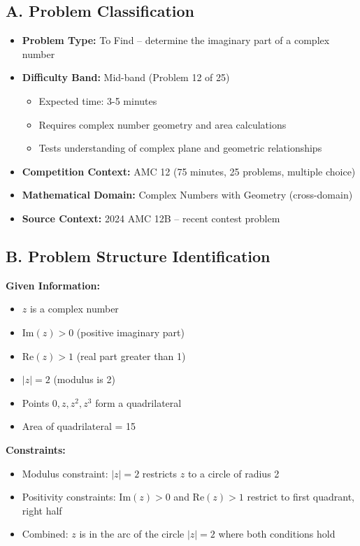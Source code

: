 \documentclass[12pt]{article}
\begin{document}
\begin{problemconfigbox}
\subsection*{A. Problem Classification}

\begin{itemize}[leftmargin=*]
    \item \textbf{Problem Type:} To Find -- determine the imaginary part of a complex number
    \item \textbf{Difficulty Band:} Mid-band (Problem 12 of 25)
    \begin{itemize}
        \item Expected time: 3-5 minutes
        \item Requires complex number geometry and area calculations
        \item Tests understanding of complex plane and geometric relationships
    \end{itemize}
    \item \textbf{Competition Context:} AMC 12 (75 minutes, 25 problems, multiple choice)
    \item \textbf{Mathematical Domain:} Complex Numbers with Geometry (cross-domain)
    \item \textbf{Source Context:} 2024 AMC 12B -- recent contest problem
\end{itemize}

\subsection*{B. Problem Structure Identification}

\textbf{Given Information:}
\begin{itemize}
    \item $z$ is a complex number
    \item $\text{Im}(z) > 0$ (positive imaginary part)
    \item $\text{Re}(z) > 1$ (real part greater than 1)
    \item $|z| = 2$ (modulus is 2)
    \item Points $0, z, z^2, z^3$ form a quadrilateral
    \item Area of quadrilateral = 15
\end{itemize}

\textbf{Constraints:}
\begin{itemize}
    \item Modulus constraint: $|z| = 2$ restricts $z$ to a circle of radius 2
    \item Positivity constraints: $\text{Im}(z) > 0$ and $\text{Re}(z) > 1$ restrict to first quadrant, right half
    \item Combined: $z$ is in the arc of the circle $|z| = 2$ where both conditions hold
\end{itemize}


\end{problemconfigbox}
\end{document}

